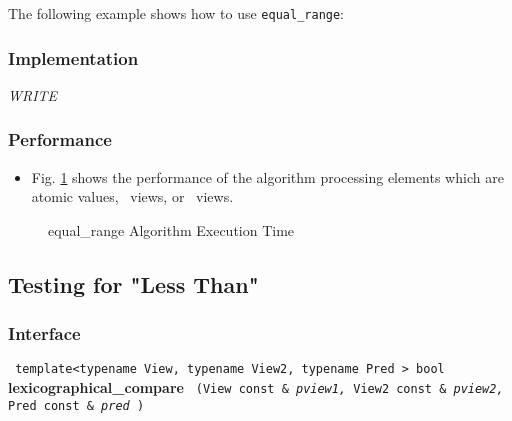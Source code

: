 The following example shows how to use \texttt{equal\_range}:

 
\subsubsection{Implementation} %

\textit{WRITE}

\subsubsection{Performance} %

\begin{itemize}
\item
Fig. \ref{fig:eq-range-alg-exec-exper}
shows the performance of the algorithm processing
elements which are atomic values, \stl\ views, or \stapl\ views.
\end{itemize}

\begin{figure}[p]
\caption{equal\_range Algorithm Execution Time}
\label{fig:eq-range-alg-exec-exper}
\end{figure}



\subsection{Testing for "Less Than"} \label{sec-sort-lex_comp}

\subsubsection{Interface} %

\noindent
\texttt{%
template<typename View, typename View2, typename Pred >
\newline
bool 
}
\newline
\textbf{lexicographical\_compare}%
\texttt{%
(View const \&
\textit{pview1,}%
View2 const \&
\textit{pview2,}%
Pred const \&
\textit{pred}%
)
}
\vspace{0.4cm}

